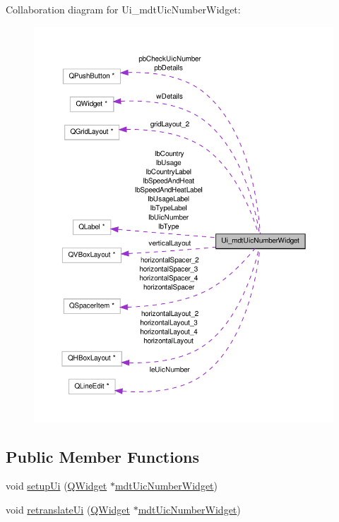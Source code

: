 Collaboration diagram for Ui\-\_\-mdt\-Uic\-Number\-Widget\-:\nopagebreak
\begin{figure}[H]
\begin{center}
\leavevmode
\includegraphics[width=350pt]{class_ui__mdt_uic_number_widget__coll__graph}
\end{center}
\end{figure}
\subsection*{Public Member Functions}
\begin{DoxyCompactItemize}
\item 
void \hyperlink{class_ui__mdt_uic_number_widget_a5bcf4bc93d6fb43df9c27415267b9861}{setup\-Ui} (\hyperlink{class_q_widget}{Q\-Widget} $\ast$\hyperlink{classmdt_uic_number_widget}{mdt\-Uic\-Number\-Widget})
\item 
void \hyperlink{class_ui__mdt_uic_number_widget_a6b54290c2309a71e43004ccf22a7796a}{retranslate\-Ui} (\hyperlink{class_q_widget}{Q\-Widget} $\ast$\hyperlink{classmdt_uic_number_widget}{mdt\-Uic\-Number\-Widget})
\end{DoxyCompactItemize}

